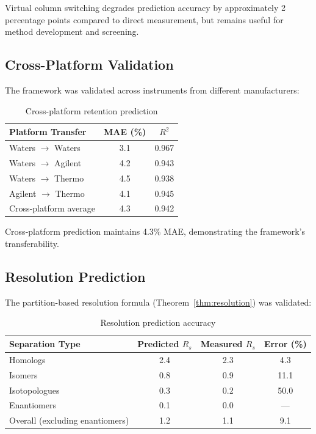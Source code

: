 \documentclass[twocolumn,10pt]{article}
\begin{document}
Virtual column switching degrades prediction accuracy by approximately 2 percentage points compared to direct measurement, but remains useful for method development and screening.

\subsection{Cross-Platform Validation}

The framework was validated across instruments from different manufacturers:

\begin{table}[H]
\centering
\caption{Cross-platform retention prediction}
\label{tab:crossplatform}
\begin{tabular}{lcc}
\toprule
Platform Transfer & MAE (\%) & $R^2$ \\
\midrule
Waters $\to$ Waters & 3.1 & 0.967 \\
Waters $\to$ Agilent & 4.2 & 0.943 \\
Waters $\to$ Thermo & 4.5 & 0.938 \\
Agilent $\to$ Thermo & 4.1 & 0.945 \\
\midrule
Cross-platform average & 4.3 & 0.942 \\
\bottomrule
\end{tabular}
\end{table}

Cross-platform prediction maintains 4.3\% MAE, demonstrating the framework's transferability.

\subsection{Resolution Prediction}

The partition-based resolution formula (Theorem~\ref{thm:resolution}) was validated:

\begin{table}[H]
\centering
\caption{Resolution prediction accuracy}
\label{tab:resolution}
\begin{tabular}{lccc}
\toprule
Separation Type & Predicted $R_s$ & Measured $R_s$ & Error (\%) \\
\midrule
Homologs & 2.4 & 2.3 & 4.3 \\
Isomers & 0.8 & 0.9 & 11.1 \\
Isotopologues & 0.3 & 0.2 & 50.0 \\
Enantiomers & 0.1 & 0.0 & --- \\
\midrule
Overall (excluding enantiomers) & 1.2 & 1.1 & 9.1 \\
\bottomrule
\end{tabular}
\end{table}
\end{document}
